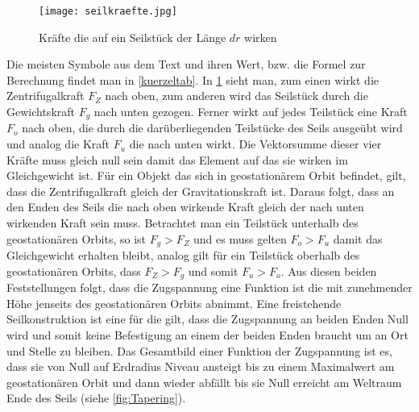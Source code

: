 \documentclass[a4paper, 10pt]{report}
\begin{document}
\begin{figure}[h]
	\centering
	\texttt{[image: seilkraefte.jpg]} 
	\caption{Kräfte die auf ein Seilstück der Länge $dr$ wirken}
	\label{Seilkraefte}

\end{figure}


Die meisten Symbole aus dem Text und ihren Wert, bzw. die Formel zur Berechnung findet man in \autoref{kuerzeltab}. In \ref{Seilkraefte} sieht man, zum einen wirkt die Zentrifugalkraft $F_Z$ nach oben, zum anderen wird das Seilstück durch die Gewichtskraft $F_g$ nach unten gezogen. Ferner wirkt auf jedes Teilstück eine Kraft $F_o$ nach oben, die durch die darüberliegenden Teilstücke des Seils ausgeübt wird und analog die Kraft $F_u$ die nach unten wirkt. Die Vektorsumme dieser vier Kräfte muss gleich null sein damit das Element auf das sie wirken im Gleichgewicht ist. Für ein Objekt das sich in geostationärem Orbit befindet, gilt, dass die Zentrifugalkraft gleich der Gravitationskraft ist. Daraus folgt, dass an den Enden des Seils die nach oben wirkende Kraft gleich der nach unten wirkenden Kraft sein muss. Betrachtet man ein Teilstück unterhalb des geostationären Orbits, so ist $F_g > F_Z$ und es muss gelten $F_o > F_u$ damit das Gleichgewicht erhalten bleibt, analog gilt für ein Teilstück oberhalb des geostationären Orbits, dass $F_Z > F_g$ und somit $F_u > F_o$. Aus diesen beiden Feststellungen folgt, dass die Zugspannung eine Funktion ist die mit zunehmender Höhe jenseits des geostationären Orbits abnimmt. Eine freistehende Seilkonstruktion ist eine für die gilt, dass die Zugspannung an beiden Enden Null wird und somit keine Befestigung an einem der beiden Enden braucht um an Ort und Stelle zu bleiben. Das Gesamtbild einer Funktion der Zugspannung ist es, dass sie von Null auf Erdradius Niveau ansteigt bis zu einem Maximalwert am geostationären Orbit und dann wieder abfällt bis sie Null erreicht am Weltraum Ende des Seils (siehe \autoref{fig:Tapering}).\cite[vgl. II Height of a free standing tower at the earth's equator]{AR07} \\
\end{document}
